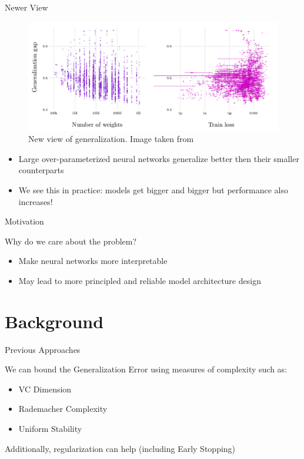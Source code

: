 \documentclass[10pt]{beamer}
\begin{document}
\begin{frame}{Newer View}
\begin{figure}
\centering
	\includegraphics[width=0.7\linewidth]{bigmodels}
\caption{New view of generalization. Image taken from \cite{2018arXiv180208760N}}
\end{figure}
\begin{itemize}
	\item Large over-parameterized neural networks generalize better then their smaller counterparts 
	\item We see this in practice: models get bigger and bigger but performance also increases!
\end{itemize}

	
\end{frame}	

\begin{frame}{Motivation}
\begin{center}
	Why do we care about the problem?
\end{center}
\begin{itemize}
	\item Make neural networks more interpretable
	\item May lead to more principled and reliable model architecture design
\end{itemize}


\end{frame}	

\section{Background}

\begin{frame}{Previous Approaches}
	
We can bound the Generalization Error using measures of complexity such as:
\begin{itemize}
	\item VC Dimension 
	\item Rademacher Complexity
	\item Uniform Stability
\end{itemize}
Additionally, regularization can help (including Early Stopping)
\end{frame}	
\end{document}
